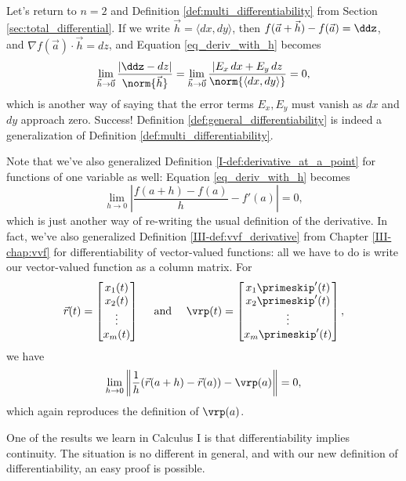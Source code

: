 Let's return to $n=2$ and Definition \ref{def:multi_differentiability} from Section \ref{sec:total_differential}. If we write $\vec{h} = \langle dx, dy\rangle$, then $f(\vec{a}+\vec{h})-f(\vec{a}) = \ddz$, and $\nabla f(\vec{a})\cdot \vec{h} = dz$, and Equation \eqref{eq_deriv_with_h} becomes
\[
\lim_{\vec{h}\to\vec{0}}\frac{\lvert \ddz-dz\rvert}{\norm{\vec{h}}} = \lim_{\vec{h}\to\vec{0}}\frac{\lvert E_x\,dx+E_y\,dz}{\norm{\langle dx,dy\rangle}} = 0,
\]
which is another way of saying that the error terms $E_x,E_y$ must vanish as $dx$ and $dy$ approach zero. Success! Definition \ref{def:general_differentiability} is indeed a generalization of Definition \ref{def:multi_differentiability}.

Note that we've also generalized Definition \ref{I-def:derivative_at_a_point} for functions of one variable as well: Equation \eqref{eq_deriv_with_h} becomes
\[
\lim_{h\to 0}\left\lvert \frac{f(a+h)-f(a)}{h}-f'(a)\right\rvert = 0,
\]
which is just another way of re-writing the usual definition of the derivative. In fact, we've also generalized Definition \ref{III-def:vvf_derivative} from Chapter \ref{III-chap:vvf} for differentiability of vector-valued functions: all we have to do is write our vector-valued function as a column matrix. For
\[
\vec{r}(t) = \begin{bmatrix}x_1(t)\\x_2(t)\\\vdots \\x_m(t)\end{bmatrix} \quad \text{ and } \quad \vrp(t) = \begin{bmatrix}x_1\primeskip'(t)\\x_2\primeskip'(t)\\\vdots \\x_m\primeskip'(t)\end{bmatrix},
\]
we have
\[
\lim_{h\to 0}\left\lVert \frac{1}{h}(\vec{r}(a+h)-\vec{r}(a))- \vrp(a)\right\rVert = 0,
\]
which again reproduces the definition of $\vrp(a)$.

One of the results we learn in Calculus I is that differentiability implies continuity. The situation is no different in general, and with our new definition of differentiability, an easy proof is possible.

\\

